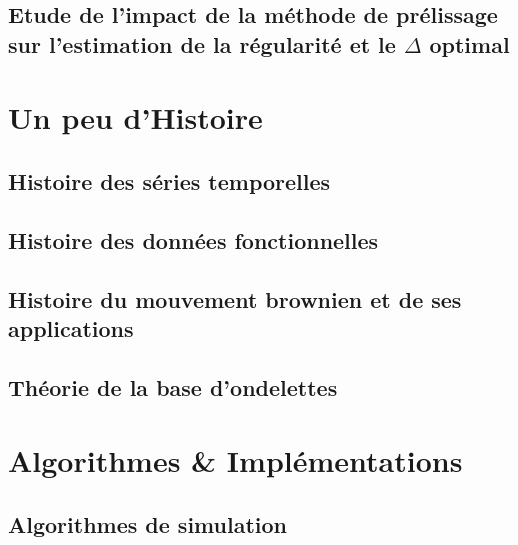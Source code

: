 \section{Etude de l'impact de la méthode de prélissage sur l'estimation de la régularité et le $\Delta$ optimal}
\label{annexe:prelissage_impact}


\chapter{Un peu d'Histoire}
\label{annexe:histoire}
\section{ Histoire des séries temporelles }

\pagebreak
\section{ Histoire des données fonctionnelles }

\pagebreak
\section{Histoire du mouvement brownien et de ses applications}


\section{Théorie de la base d'ondelettes}
\label{annexe:wavelet}

\pagebreak

% 

\chapter{Algorithmes \& Implémentations}

\label{annexe:code}
\section{Algorithmes de simulation}



